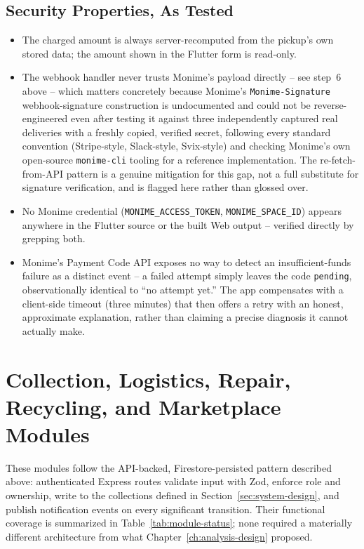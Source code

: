\subsection{Security Properties, As Tested}
\begin{itemize}
  \item The charged amount is always server-recomputed from the pickup's
    own stored data; the amount shown in the Flutter form is read-only.
  \item The webhook handler never trusts Monime's payload directly -- see
    step~6 above -- which matters concretely because Monime's
    \texttt{Monime-Signature} webhook-signature construction is undocumented
    and could not be reverse-engineered even after testing it against three
    independently captured real deliveries with a freshly copied, verified
    secret, following every standard convention (Stripe-style, Slack-style,
    Svix-style) and checking Monime's own open-source \texttt{monime-cli}
    tooling for a reference implementation. The re-fetch-from-API pattern is a
    genuine mitigation for this gap, not a full substitute for signature
    verification, and is flagged here rather than glossed over.
  \item No Monime credential (\texttt{MONIME\_ACCESS\_TOKEN},
    \texttt{MONIME\_SPACE\_ID}) appears anywhere in the Flutter source or the
    built Web output -- verified directly by grepping both.
  \item Monime's Payment Code API exposes no way to detect an
    insufficient-funds failure as a distinct event -- a failed attempt simply
    leaves the code \texttt{pending}, observationally identical to ``no attempt
    yet.'' The app compensates with a client-side timeout (three minutes)
    that then offers a retry with an honest, approximate explanation, rather
    than claiming a precise diagnosis it cannot actually make.
\end{itemize}

\section{Collection, Logistics, Repair, Recycling, and Marketplace Modules}
These modules follow the API-backed, Firestore-persisted pattern described
above: authenticated Express routes validate input with Zod, enforce role and
ownership, write to the collections defined in
Section~\ref{sec:system-design}, and publish notification events on every
significant transition. Their functional coverage is summarized in
Table~\ref{tab:module-status}; none required a materially different
architecture from what Chapter~\ref{ch:analysis-design} proposed.

